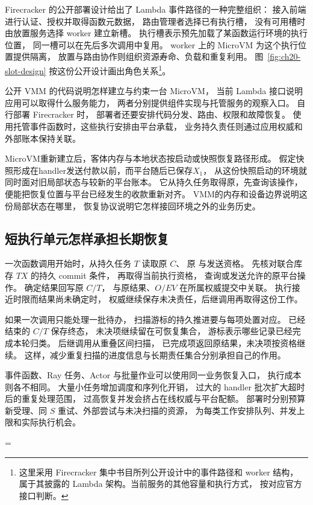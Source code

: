 Firecracker 的公开部署设计给出了 Lambda 事件路径的一种完整组织：
接入前端进行认证、授权并取得函数元数据，
路由管理者选择已有执行槽，
没有可用槽时由放置服务选择 worker 建立新槽。
执行槽表示预先加载了某函数运行环境的执行位置，
同一槽可以在先后多次调用中复用。
worker 上的 MicroVM 为这个执行位置提供隔离，
放置与路由协作则组织资源寿命、负载和重复利用。
图~\ref{fig:ch20-slot-design} 按这份公开设计画出角色关系\footnote{这里采用
Firecracker 集中书目所列公开设计中的事件路径和 worker 结构，
属于其披露的 Lambda 架构。当前服务的其他容量和执行方式，
按对应官方接口判断。}。


公开 VMM 的代码说明怎样建立与约束一台 MicroVM，
当前 Lambda 接口说明应用可以取得什么服务能力，
两者分别提供组件实现与托管服务的观察入口。
自行部署 Firecracker 时，
部署者还要安排代码分发、路由、权限和故障恢复。
使用托管事件函数时，这些执行安排由平台承载，
业务持久责任则通过应用权威和外部账本保持关联。

MicroVM重新建立后，客体内存与本地状态按启动或快照恢复路径形成。
假定快照形成在handler发送付款以前，而平台随后已保存$X_1$，
从这份快照启动的环境就同时面对旧局部状态与较新的平台账本。
它从持久任务取得原，先查询该操作，
便能把恢复位置与平台已经发生的收款重新对齐。
VMM的内存和设备边界说明这份局部状态在哪里，
恢复协议说明它怎样接回环境之外的业务历史。

\subsection{短执行单元怎样承担长期恢复}

一次函数调用开始时，从持久任务 $T$ 读取原 $C$、
原  与发送资格。
先核对联合库存 $TX$ 的持久 commit 条件，
再取得当前执行资格，
查询或发送允许的原平台操作。
确定结果回写原 $C/T$，
与原结果、$O/EV$ 在所属权威提交中关联。
执行接近时限而结果尚未确定时，
权威继续保存未决责任，后继调用再取得这份工作。

如果一次调用只能处理一批待办，
扫描游标的持久推进要与每项处置对应。
已经结束的 $C/T$ 保存终态，
未决项继续留在可恢复集合，
游标表示哪些记录已经完成本轮归类。
后继调用从重叠区间扫描，
已完成项返回原结果，未决项按资格继续。
这样，减少重复扫描的进度信息与长期责任集合分别承担自己的作用。


事件函数、Ray 任务、Actor 与批量作业可以使用同一业务恢复入口，
执行成本则各不相同。
大量小任务增加调度和序列化开销，
过大的 handler 批次扩大超时后的重复处理范围，
过高恢复并发会挤占在线权威与平台配额。
部署时分别预算新受理、同 $S$ 重试、外部尝试与未决扫描的资源，
为每类工作安排队列、并发上限和实际执行机会。

\let\code\BeforeTwentyCode
\setlength{\emergencystretch}{\BeforeTwentyEmergency}
\tolerance=\BeforeTwentyTolerance
